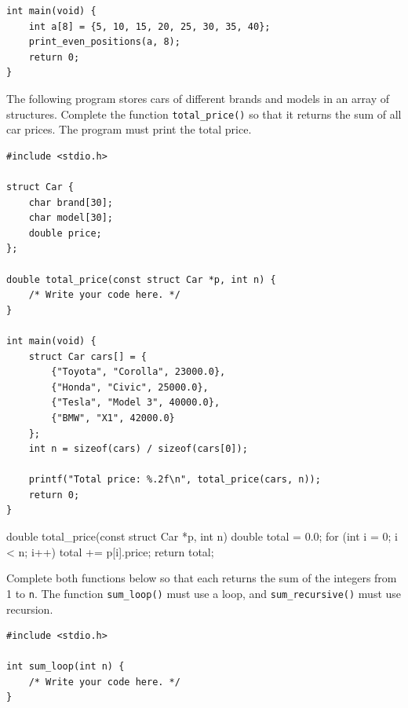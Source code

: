 \documentclass[12pt,a4paper,answers,addpoints]{exam}
\begin{document}
\begin{questions}
\begin{lstlisting}[style=examc]
int main(void) {
    int a[8] = {5, 10, 15, 20, 25, 30, 35, 40};
    print_even_positions(a, 8);
    return 0;
}
\end{lstlisting}

\newpage
{}

\question[10] The following program stores cars of different brands and models in
an array of structures. Complete the function \texttt{total\_price()} so that it
returns the sum of all car prices. The program must print the total price.
\begin{lstlisting}[style=examc]
#include <stdio.h>

struct Car {
    char brand[30];
    char model[30];
    double price;
};

double total_price(const struct Car *p, int n) {
    /* Write your code here. */
}

int main(void) {
    struct Car cars[] = {
        {"Toyota", "Corolla", 23000.0},
        {"Honda", "Civic", 25000.0},
        {"Tesla", "Model 3", 40000.0},
        {"BMW", "X1", 42000.0}
    };
    int n = sizeof(cars) / sizeof(cars[0]);

    printf("Total price: %.2f\n", total_price(cars, n));
    return 0;
}
\end{lstlisting}
\shownoanswers{\vspace{8cm}}
\begin{CcodeSol}
double total_price(const struct Car *p, int n) {
    double total = 0.0;
    for (int i = 0; i < n; i++)
        total += p[i].price;
    return total;
}
\end{CcodeSol}

\newpage
\question[10] Complete both functions below so that each returns the sum of the
integers from 1 to \texttt{n}. The function \texttt{sum\_loop()} must use a loop,
and \texttt{sum\_recursive()} must use recursion. 
\begin{lstlisting}[style=examc]
#include <stdio.h>

int sum_loop(int n) {
    /* Write your code here. */
}


\end{lstlisting}
\end{questions}
\end{document}
